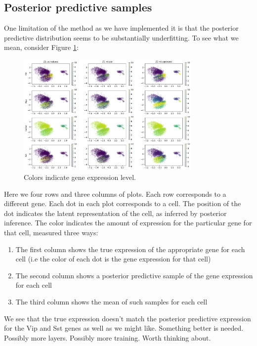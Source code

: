 \subsection{Posterior predictive samples}

One limitation of the method as we have implemented it is that the posterior predictive distribution seems to be substantially underfitting.  To see what we mean, consider Figure \ref{fig:Z1gn}:

\begin{figure}
\includegraphics[width=0.8\textwidth]{pics/Z1gn}
\caption{Colors indicate gene expression level. \label{fig:Z1gn}}
\end{figure}

Here we four rows and three columns of plots.  Each row corresponds to a different gene.  Each dot in each plot corresponds to a cell.  The position of the dot indicates the latent representation of the cell, as inferred by posterior inference.  The color indicates the amount of expression for the particular gene for that cell, measured three ways:

\begin{enumerate}
\item The first column shows the true expression of the appropriate gene for each cell (i.e the color of each dot is the gene expression for that cell)
\item The second column shows a posterior predictive sample of the gene expression for each cell
\item The third column shows the mean of such samples for each cell
\end{enumerate}

We see that the true expression doesn't match the posterior predictive expression for the Vip and Sst genes as well as we might like.  Something better is needed.  Possibly more layers.  Possibly more training.  Worth thinking about.

